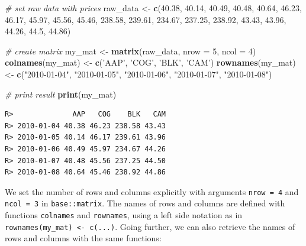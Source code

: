 \documentclass[
  12pt,
]{book}
\newenvironment{Shaded}{\begin{snugshade}}{\end{snugshade}}
\newcommand{\CommentTok}[1]{\textcolor[rgb]{0.37,0.37,0.37}{\textit{#1}}}
\newcommand{\DataTypeTok}[1]{\textcolor[rgb]{0.27,0.27,0.27}{#1}}
\newcommand{\DecValTok}[1]{\textcolor[rgb]{0.06,0.06,0.06}{#1}}
\newcommand{\FloatTok}[1]{\textcolor[rgb]{0.06,0.06,0.06}{#1}}
\newcommand{\KeywordTok}[1]{\textcolor[rgb]{0.27,0.27,0.27}{\textbf{#1}}}
\newcommand{\NormalTok}[1]{#1}
\newcommand{\StringTok}[1]{\textcolor[rgb]{0.5,0.5,0.5}{#1}}
\begin{document}
\begin{Shaded}
\begin{Highlighting}[]
\CommentTok{# set raw data with prices }
\NormalTok{raw_data <-}\StringTok{ }\KeywordTok{c}\NormalTok{(}\FloatTok{40.38}\NormalTok{,  }\FloatTok{40.14}\NormalTok{,  }\FloatTok{40.49}\NormalTok{,  }\FloatTok{40.48}\NormalTok{,  }\FloatTok{40.64}\NormalTok{,}
              \FloatTok{46.23}\NormalTok{,  }\FloatTok{46.17}\NormalTok{,  }\FloatTok{45.97}\NormalTok{,  }\FloatTok{45.56}\NormalTok{,  }\FloatTok{45.46}\NormalTok{,}
              \FloatTok{238.58}\NormalTok{, }\FloatTok{239.61}\NormalTok{, }\FloatTok{234.67}\NormalTok{, }\FloatTok{237.25}\NormalTok{, }\FloatTok{238.92}\NormalTok{,}
              \FloatTok{43.43}\NormalTok{,  }\FloatTok{43.96}\NormalTok{,  }\FloatTok{44.26}\NormalTok{,  }\FloatTok{44.5}\NormalTok{,   }\FloatTok{44.86}\NormalTok{)}

\CommentTok{# create matrix          }
\NormalTok{my_mat <-}\StringTok{ }\KeywordTok{matrix}\NormalTok{(raw_data, }\DataTypeTok{nrow =} \DecValTok{5}\NormalTok{, }\DataTypeTok{ncol =} \DecValTok{4}\NormalTok{)}
\KeywordTok{colnames}\NormalTok{(my_mat) <-}\StringTok{ }\KeywordTok{c}\NormalTok{(}\StringTok{'AAP'}\NormalTok{, }\StringTok{'COG'}\NormalTok{, }\StringTok{'BLK'}\NormalTok{, }\StringTok{'CAM'}\NormalTok{)}
\KeywordTok{rownames}\NormalTok{(my_mat) <-}\StringTok{ }\KeywordTok{c}\NormalTok{(}\StringTok{"2010-01-04"}\NormalTok{, }\StringTok{"2010-01-05"}\NormalTok{, }\StringTok{"2010-01-06"}\NormalTok{, }
                      \StringTok{"2010-01-07"}\NormalTok{, }\StringTok{"2010-01-08"}\NormalTok{)}

\CommentTok{# print result}
\KeywordTok{print}\NormalTok{(my_mat)}
\end{Highlighting}
\end{Shaded}

\begin{verbatim}
R>              AAP   COG    BLK   CAM
R> 2010-01-04 40.38 46.23 238.58 43.43
R> 2010-01-05 40.14 46.17 239.61 43.96
R> 2010-01-06 40.49 45.97 234.67 44.26
R> 2010-01-07 40.48 45.56 237.25 44.50
R> 2010-01-08 40.64 45.46 238.92 44.86
\end{verbatim}

We set the number of rows and columns explicitly with arguments \texttt{nrow\ =\ 4} and \texttt{ncol\ =\ 3} in \texttt{base::matrix}. The names of rows and columns are defined with functions \texttt{colnames} and \texttt{rownames}, using a left side notation as in \texttt{rownames(my\_mat)\ \textless{}-\ c(...)}. Going further, we can also retrieve the names of rows and columns with the same functions:  
\end{document}
